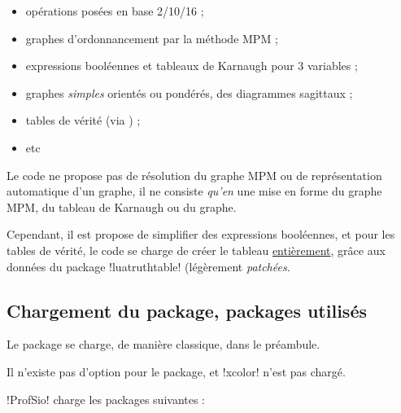 \documentclass[french,a4paper,11pt]{article}
\begin{document}
{{\begin{noteblock}
\begin{itemize}
	\item opérations posées en base 2/10/16 ;
	\item graphes d'ordonnancement par la méthode MPM ;
	\item expressions booléennes et tableaux de Karnaugh pour 3 variables ;
	\item graphes \textit{simples} orientés ou pondérés, des diagrammes sagittaux ;
	\item tables de vérité (via ) ;
	\item etc
\end{itemize}
\vspace*{-\baselineskip}\leavevmode
\end{noteblock}

\begin{warningblock}
Le code ne propose pas de \og résolution \fg{} du graphe MPM ou de représentation \og automatique \fg{} d'un graphe, il ne consiste \textit{qu'en} une mise en forme du graphe MPM, du tableau de Karnaugh ou du graphe.

\smallskip

Cependant, il est propose de \og simplifier \fg{} des expressions booléennes, et pour les tables de vérité, le code se charge de créer le tableau \underline{entièrement}, grâce aux données du package \packagetex!luatruthtable! (légèrement \textit{patchées}.
\end{warningblock}

\subsection{Chargement du package, packages utilisés}

\begin{importantblock}
Le package se charge, de manière classique, dans le préambule.

Il n'existe pas d'option pour le package, et \packagetex!xcolor! n'est pas chargé.
\end{importantblock}


\begin{noteblock}
\packagetex!ProfSio! charge les packages suivantes :


\end{noteblock}}}
\end{document}
